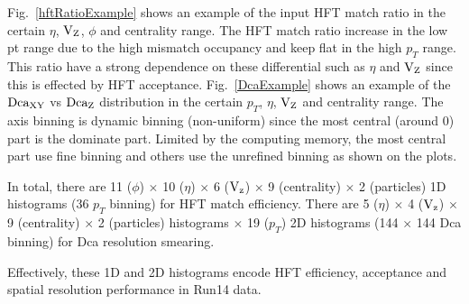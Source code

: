 Fig.~\ref{hftRatioExample} shows an example of the input HFT match ratio in the certain $\eta$, $\textup{V}_\textup{Z}$, $\phi$ and centrality range. The HFT match ratio increase in the low pt range due to the high mismatch occupancy and keep flat in the high $p_T$ range. This ratio have a strong dependence on these differential such as $\eta$ and $\textup{V}_\textup{Z}$ since this is effected by HFT acceptance. Fig.~\ref{DcaExample} shows an example of the $\textup{Dca}_{\textup{XY}}$ vs $\textup{Dca}_{\textup{Z}}$ distribution in the certain $p_T$, $\eta$, $\textup{V}_\textup{Z}$ and centrality range. The axis binning is dynamic binning (non-uniform) since the most central (around 0) part is the dominate part. Limited by the computing memory, the most central part use fine binning and others use the unrefined binning as shown on the plots.

In total, there are 11 ($\phi$) $\times$ 10 ($\eta$) $\times$ 6 ($\textup{V}_\textup{z}$) $\times$ 9 (centrality) $\times$ 2 (particles) 1D histograms (36 $p_T$ binning) for HFT match efficiency.
There are 5 ($\eta$) $\times$ 4 ($\textup{V}_\textup{z}$) $\times$ 9 (centrality) $\times$ 2 (particles) histograms $\times$ 19 ($p_T$) 2D histograms (144 $\times$ 144 Dca binning) for Dca resolution smearing.

Effectively, these 1D and 2D histograms encode HFT efficiency, acceptance and spatial resolution performance in Run14 data.

